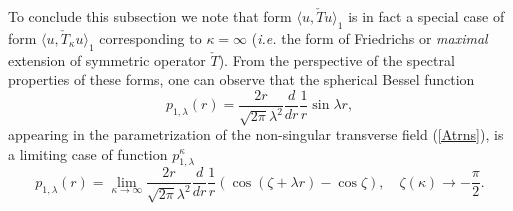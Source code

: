 \documentclass[12pt]{article}
\begin{document}
	To conclude this subsection we note that form
$ \langle u, \check{T} u\rangle_{1} $
	is in fact a special case of form
$ \langle u, \check{T}_{\kappa} u\rangle_{1} $
	corresponding to
$ \kappa = \infty $
    ({\it i.e.} the form of Friedrichs or \emph{maximal} extension
    of symmetric operator
$ \check{T} $).
	From the perspective of the spectral properties of these forms,
	one can observe that the spherical Bessel function
\begin{equation*}
    p_{1,\lambda}(r) = \frac{2r}{\sqrt{2\pi}\lambda^{2}}
	\frac{d}{dr}\frac{1}{r} \sin \lambda r ,
\end{equation*}
	appearing in the parametrization of the non-singular transverse field
(\ref{Atrns}),
	is a limiting case of function
$ p_{1,\lambda}^{\kappa} $
\begin{equation*}
    p_{1,\lambda}(r)  
        = \lim_{\kappa\to\infty}
    \frac{2r}{\sqrt{2\pi}\lambda^{2}} \frac{d}{dr}\frac{1}{r}
    (\cos(\zeta +\lambda r) - \cos\zeta) ,\quad \zeta(\kappa)\to -\frac{\pi}{2}.
\end{equation*}
\end{document}
